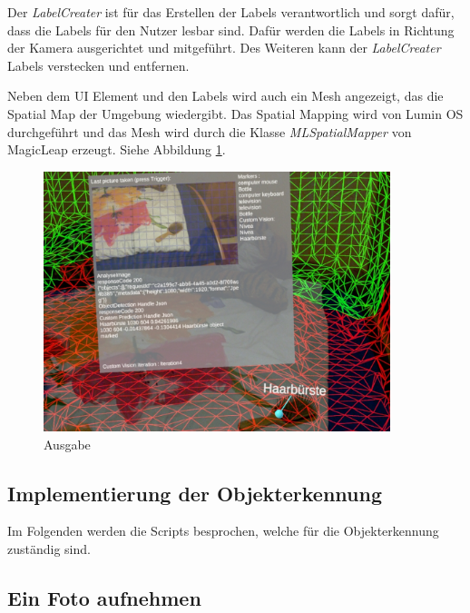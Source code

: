 
Der \textit{LabelCreater} ist für das Erstellen der Labels verantwortlich und sorgt dafür, dass die Labels für den Nutzer lesbar sind. Dafür werden die Labels in Richtung der Kamera ausgerichtet und mitgeführt.
Des Weiteren kann der \textit{LabelCreater} Labels verstecken und entfernen.

Neben dem UI Element und den Labels wird auch ein Mesh angezeigt, das die Spatial Map der Umgebung wiedergibt. Das Spatial Mapping wird von Lumin OS durchgeführt und das Mesh wird durch die Klasse \textit{MLSpatialMapper} von MagicLeap erzeugt. Siehe Abbildung \ref{img:ausgabe}.

\begin{figure}[H]
	\centering
	\includegraphics[width=0.9\textwidth]{images/ML_20201004_19.09.17_2.jpg}
	\caption[UI Ausgabe in der Szene]{Ausgabe}
	\label{img:ausgabe}
\end{figure}


\subsection{Implementierung der Objekterkennung}

Im Folgenden werden die Scripts besprochen, welche für die Objekterkennung zuständig sind.

\subsection{Ein Foto aufnehmen}

